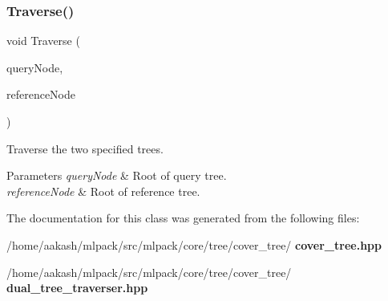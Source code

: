 \subsubsection{Traverse()}
{\footnotesize\ttfamily void Traverse (\begin{DoxyParamCaption}\item[{\textbf{ Cover\+Tree} \&}]{query\+Node,  }\item[{\textbf{ Cover\+Tree} \&}]{reference\+Node }\end{DoxyParamCaption})}



Traverse the two specified trees. 


\begin{DoxyParams}{Parameters}
{\em query\+Node} & Root of query tree. \\
\hline
{\em reference\+Node} & Root of reference tree. \\
\hline
\end{DoxyParams}


The documentation for this class was generated from the following files\+:\begin{DoxyCompactItemize}
\item 
/home/aakash/mlpack/src/mlpack/core/tree/cover\+\_\+tree/\textbf{ cover\+\_\+tree.\+hpp}\item 
/home/aakash/mlpack/src/mlpack/core/tree/cover\+\_\+tree/\textbf{ dual\+\_\+tree\+\_\+traverser.\+hpp}\end{DoxyCompactItemize}
